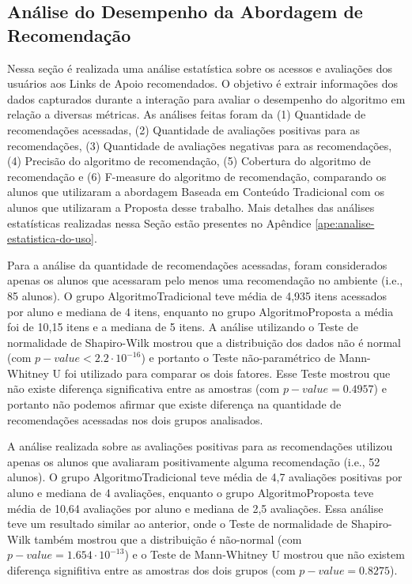 \subsection{Análise do Desempenho da Abordagem de Recomendação}\label{subsection:analise-uso-sr}

Nessa seção é realizada uma análise estatística sobre os acessos e avaliações dos usuários aos Links de Apoio recomendados.
O objetivo é extrair informações dos dados capturados durante a interação para avaliar o desempenho do algoritmo em
relação a diversas métricas. As análises feitas foram da (1) Quantidade de recomendações acessadas,
(2) Quantidade de avaliações positivas para as recomendações, (3) Quantidade de avaliações negativas para as recomendações,
(4) Precisão do algoritmo de recomendação, (5) Cobertura do algoritmo de recomendação e (6) F-measure do algoritmo de
recomendação, comparando os alunos que utilizaram a abordagem Baseada em Conteúdo Tradicional com os alunos
que utilizaram a Proposta desse trabalho.  Mais detalhes das análises estatísticas realizadas nessa Seção estão presentes no Apêndice \ref{ape:analise-estatistica-do-uso}.

Para a análise da quantidade de recomendações acessadas, foram considerados apenas os alunos que acessaram pelo
menos uma recomendação no ambiente (i.e., 85 alunos). O grupo AlgoritmoTradicional teve média de 4,935 itens
acessados por aluno e mediana de 4 itens, enquanto no grupo AlgoritmoProposta a média foi de 10,15 itens e a mediana de 5 itens.
A análise utilizando o Teste de normalidade de Shapiro-Wilk mostrou que a distribuição dos dados não é normal (com $p-value < 2.2 \cdot 10^{-16}$)
e portanto o Teste não-paramétrico de Mann-Whitney U foi utilizado
para comparar os dois fatores. Esse Teste mostrou que não existe diferença significativa entre as amostras (com $p-value = 0.4957$) e portanto
não podemos afirmar que existe diferença na quantidade de recomendações acessadas nos dois grupos analisados.

A análise realizada sobre as avaliações positivas para as recomendações utilizou apenas os alunos que avaliaram positivamente
alguma recomendação (i.e., 52 alunos). O grupo AlgoritmoTradicional teve média de 4,7 avaliações positivas por aluno e
mediana de 4 avaliações, enquanto o grupo AlgoritmoProposta teve média de 10,64 avaliações por aluno e mediana de 2,5 avaliações.
Essa análise teve um resultado similar ao anterior, onde o Teste de normalidade de Shapiro-Wilk também mostrou que a
distribuição é não-normal (com $p-value = 1.654 \cdot 10^{-13}$) e o Teste de Mann-Whitney U mostrou que não existem diferença signifitiva entre
as amostras dos dois grupos (com $p-value = 0.8275$).


